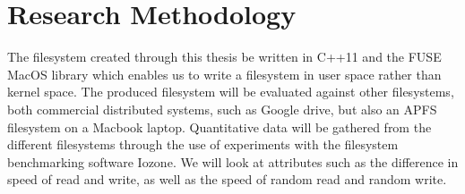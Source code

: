 
\section{Research Methodology}%

The filesystem created through this thesis be written in C++11 and the FUSE MacOS library\cite{HomeMacFUSE} which enables us to write a filesystem in user space rather than kernel space. The produced filesystem will be evaluated against other filesystems, both commercial distributed systems, such as Google drive, but also an APFS filesystem on a Macbook laptop. Quantitative data will be gathered from the different filesystems through the use of experiments with the filesystem benchmarking software Iozone\cite{IozoneFilesystemBenchmark}. We will look at attributes such as the difference in speed of read and write, as well as the speed of random read and random write. 



